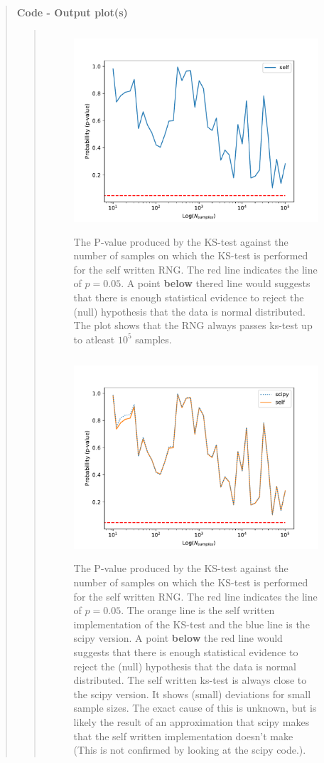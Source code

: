 \begin{quote}
\textbf{Code - Output plot(s)}
\begin{quote}
\begin{figure}[!ht]
\centering
\includegraphics[width=12cm, height=7.5cm]{./Plots/1_plot_ks_test_self.pdf}
\caption{The P-value produced by the KS-test against the number of samples on which the KS-test is performed for the self written RNG. The red line indicates the line of $ p = 0.05$. A point \textbf{below} thered  line would suggests that there is enough statistical evidence to reject the (null) hypothesis that the data is normal distributed. The plot shows that the RNG always passes ks-test up to atleast $10^5$ samples.}
\end{figure}

\begin{figure}[!hb]
\centering
\includegraphics[width=12cm, height=7.5cm]{./Plots/1_plot_ks_test_self_scipy.pdf}
\caption{The P-value produced by the KS-test against the number of samples on which the KS-test is performed for the self written RNG. The red line indicates the line of $ p = 0.05$. The orange line is the self written implementation of the KS-test and the blue line is the scipy version.  A point \textbf{below} the red line would suggests that there is enough statistical evidence to reject the (null) hypothesis that the data is normal distributed. The self written ks-test is always close to the scipy version. It shows  (small) deviations for small sample sizes. The exact cause of this is unknown, but is likely the result of an approximation that scipy makes that the self written implementation doesn't make (This is not confirmed by looking at the scipy code.). }
\end{figure}


\end{quote}
\end{quote}
